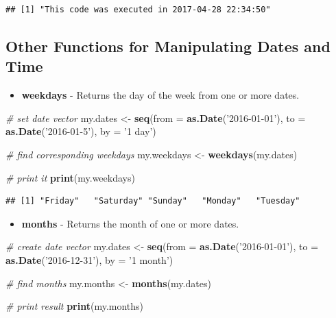 \documentclass[11pt,]{book}
\newenvironment{Shaded}{\begin{snugshade}}{\end{snugshade}}
\newcommand{\KeywordTok}[1]{\textcolor[rgb]{0.27,0.27,0.27}{\textbf{#1}}}
\newcommand{\DataTypeTok}[1]{\textcolor[rgb]{0.27,0.27,0.27}{#1}}
\newcommand{\StringTok}[1]{\textcolor[rgb]{0.5,0.5,0.5}{#1}}
\newcommand{\CommentTok}[1]{\textcolor[rgb]{0.56,0.35,0.01}{\textit{#1}}}
\newcommand{\NormalTok}[1]{#1}
\providecommand{\tightlist}{%
  \setlength{\itemsep}{0pt}\setlength{\parskip}{0pt}}
\begin{document}
\begin{verbatim}
## [1] "This code was executed in 2017-04-28 22:34:50"
\end{verbatim}

\subsection{Other Functions for Manipulating Dates and
Time}\label{other-functions-for-manipulating-dates-and-time}

\begin{itemize}
\tightlist
\item
  \textbf{weekdays} - Returns the day of the week from one or more
  dates. 
\end{itemize}

\begin{Shaded}
\begin{Highlighting}[]
\CommentTok{# set date vector}
\NormalTok{my.dates <-}\StringTok{ }\KeywordTok{seq}\NormalTok{(}\DataTypeTok{from =} \KeywordTok{as.Date}\NormalTok{(}\StringTok{'2016-01-01'}\NormalTok{), }
                \DataTypeTok{to =} \KeywordTok{as.Date}\NormalTok{(}\StringTok{'2016-01-5'}\NormalTok{), }
                \DataTypeTok{by =} \StringTok{'1 day'}\NormalTok{)}

\CommentTok{# find corresponding weekdays}
\NormalTok{my.weekdays <-}\StringTok{ }\KeywordTok{weekdays}\NormalTok{(my.dates)}

\CommentTok{# print it}
\KeywordTok{print}\NormalTok{(my.weekdays)}
\end{Highlighting}
\end{Shaded}

\begin{verbatim}
## [1] "Friday"   "Saturday" "Sunday"   "Monday"   "Tuesday"
\end{verbatim}

\begin{itemize}
\tightlist
\item
  \textbf{months} - Returns the month of one or more dates.
\end{itemize}

\begin{Shaded}
\begin{Highlighting}[]
\CommentTok{# create date vector}
\NormalTok{my.dates <-}\StringTok{ }\KeywordTok{seq}\NormalTok{(}\DataTypeTok{from =} \KeywordTok{as.Date}\NormalTok{(}\StringTok{'2016-01-01'}\NormalTok{), }
                \DataTypeTok{to =} \KeywordTok{as.Date}\NormalTok{(}\StringTok{'2016-12-31'}\NormalTok{), }
                \DataTypeTok{by =} \StringTok{'1 month'}\NormalTok{)}

\CommentTok{# find months}
\NormalTok{my.months <-}\StringTok{ }\KeywordTok{months}\NormalTok{(my.dates)}

\CommentTok{# print result}
\KeywordTok{print}\NormalTok{(my.months)}
\end{Highlighting}
\end{Shaded}
\end{document}
